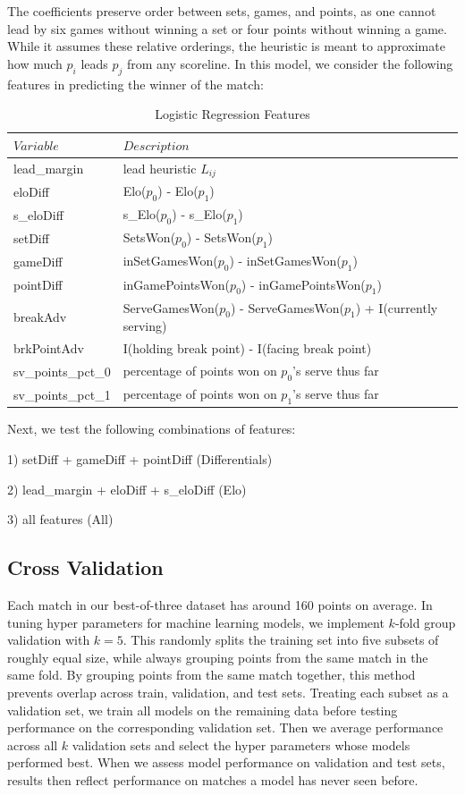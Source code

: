 \documentclass[chapterprefix=false]{report}
\begin{document}
The coefficients preserve order between sets, games, and points, as one cannot lead by six games without winning a set or four points without winning a game. While it assumes these relative orderings, the heuristic is meant to approximate how much $p_i$ leads $p_j$ from any scoreline. In this model, we consider the following features in predicting the winner of the match:

\begin{table}[H]
\centering
\caption{Logistic Regression Features}
\label{my-label}
\begin{tabular}{ll}
 \hline
 $Variable$ & $Description$ \\
 \hline
 lead\_margin & lead heuristic $L_{ij}$ \\
 \hline
 eloDiff &  Elo($p_0$) - Elo($p_1$) \\
 \hline
  s\_eloDiff &  s\_Elo($p_0$) - s\_Elo($p_1$) \\
 \hline
 setDiff &  SetsWon($p_0$) - SetsWon($p_1$)\\
 \hline
 gameDiff &  inSetGamesWon($p_0$) - inSetGamesWon($p_1$)\\
 \hline
 pointDiff &  inGamePointsWon($p_0$) - inGamePointsWon($p_1$)\\
 \hline
  breakAdv &  ServeGamesWon($p_0$) - ServeGamesWon($p_1$) + I(currently serving)\\
 \hline
 brkPointAdv & I(holding break point) - I(facing break point)\\
 \hline
 sv\_points\_pct\_0 & percentage of points won on $p_0$'s serve thus far\\
 \hline
 sv\_points\_pct\_1 & percentage of points won on $p_1$'s serve thus far\\
 \hline
\end{tabular}
\end{table}

Next, we test the following combinations of features:

1) setDiff + gameDiff + pointDiff (Differentials)

2) lead\_margin + eloDiff + s\_eloDiff (Elo)

3) all features (All)

\subsection{Cross Validation}

Each match in our best-of-three dataset has around 160 points on average. In tuning hyper parameters for machine learning models, we implement $k$-fold group validation with $k=5$. This randomly splits the training set into five subsets of roughly equal size, while always grouping points from the same match in the same fold. By grouping points from the same match together, this method prevents overlap across train, validation, and test sets. Treating each subset as a validation set, we train all models on the remaining data before testing performance on the corresponding validation set. Then we average performance across all $k$ validation sets and select the hyper parameters whose models performed best. When we assess model performance on validation and test sets, results then reflect performance on matches a model has never seen before. 
\end{document}
